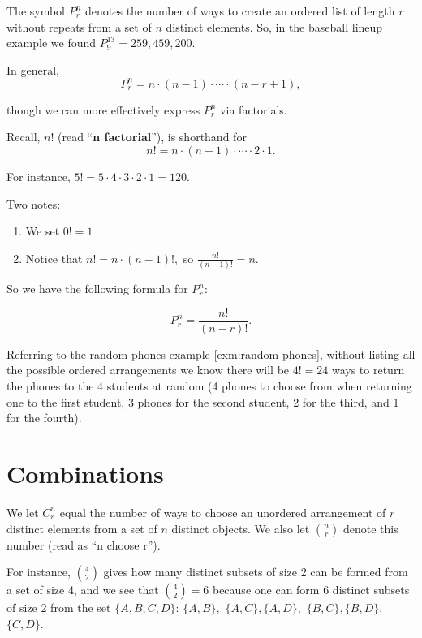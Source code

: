 \documentclass[
]{book}
\providecommand{\tightlist}{%
  \setlength{\itemsep}{0pt}\setlength{\parskip}{0pt}}
\theoremstyle{definition}
\theoremstyle{definition}
\theoremstyle{definition}
\theoremstyle{definition}
\theoremstyle{remark}
\begin{document}
The symbol \(\displaystyle P^n_r\) denotes the number of ways to create an ordered list of length \(r\) without repeats from a set of \(n\) distinct elements. So, in the baseball lineup example we found \(\displaystyle P^{13}_9 = 259,459,200.\)

In general, \[P^n_r = n \cdot (n-1) \cdot \cdots \cdot (n-r+1),\]

though we can more effectively express \(\displaystyle P^n_r\) via factorials.

Recall, \(n!\) (read ``\textbf{n factorial}''), is shorthand for \[n! = n \cdot (n-1) \cdot \cdots \cdot 2 \cdot 1.\]

For instance, \(5! = 5 \cdot 4 \cdot 3 \cdot 2 \cdot 1 = 120\).

Two notes:

\begin{enumerate}
\def\labelenumi{\arabic{enumi}.}
\tightlist
\item
  We set \(0! = 1\)
\item
  Notice that \(n! = n \cdot (n-1)!,\) so \(\displaystyle \frac{n!}{(n-1)!} = n\).
\end{enumerate}

So we have the following formula for \(\displaystyle P^n_r\):

\begin{equation} 
  P^n_r = \frac{n!}{(n-r)!}.
  \label{eq:Pnr}
\end{equation}

Referring to the random phones example \ref{exm:random-phones}, without listing all the possible ordered arrangements we know there will be \(4!= 24\) ways to return the phones to the 4 students at random (4 phones to choose from when returning one to the first student, 3 phones for the second student, 2 for the third, and 1 for the fourth).

\section{Combinations}\label{combinations}

We let \(\displaystyle C^n_r\) equal the number of ways to choose an unordered arrangement of \(r\) distinct elements from a set of \(n\) distinct objects. We also let \(\displaystyle\binom{n}{r}\) denote this number (read as ``n choose r'').

For instance, \(\displaystyle\binom{4}{2}\) gives how many distinct subsets of size 2 can be formed from a set of size 4, and we see that \(\displaystyle\binom{4}{2} = 6\) because one can form 6 distinct subsets of size 2 from the set \(\{A,B,C,D\}\): \(\{A,B\},\) \(\{A,C\},\)\(\{A,D\},\) \(\{B,C\},\)\(\{B,D\},\) \(\{C,D\}\).
\end{document}
